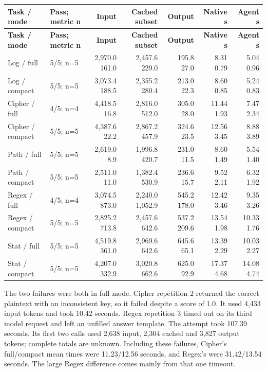 \documentclass[10pt,letterpaper]{article}
\begin{document}
\begingroup
\small
\setlength{\tabcolsep}{4pt}
\renewcommand{\arraystretch}{1.15}
\begin{longtable}{@{}llrrrrr@{}}
\toprule
\textbf{Task / mode} & \textbf{Pass; metric n} & \textbf{Input} & \textbf{Cached subset} & \textbf{Output} & \textbf{Native s} & \textbf{Agent s} \\
\midrule
\endfirsthead
\toprule
\textbf{Task / mode} & \textbf{Pass; metric n} & \textbf{Input} & \textbf{Cached subset} & \textbf{Output} & \textbf{Native s} & \textbf{Agent s} \\
\midrule
\endhead
\bottomrule
\endfoot
Log / full & 5/5; n=5 & 2,970.0 \textpm{} 161.0 & 2,457.6 \textpm{} 229.0 & 195.8 \textpm{} 27.0 & 8.31 \textpm{} 0.79 & 5.04 \textpm{} 0.96 \\
Log / compact & 5/5; n=5 & 3,073.4 \textpm{} 188.5 & 2,355.2 \textpm{} 280.4 & 213.0 \textpm{} 22.3 & 8.60 \textpm{} 0.85 & 5.24 \textpm{} 0.83 \\
Cipher / full & 4/5; n=4 & 4,418.5 \textpm{} 16.8 & 2,816.0 \textpm{} 512.0 & 305.0 \textpm{} 28.0 & 11.44 \textpm{} 1.93 & 7.47 \textpm{} 2.34 \\
Cipher / compact & 5/5; n=5 & 4,387.6 \textpm{} 22.2 & 2,867.2 \textpm{} 457.9 & 324.6 \textpm{} 23.5 & 12.56 \textpm{} 3.45 & 8.88 \textpm{} 3.89 \\
Path / full & 5/5; n=5 & 2,619.0 \textpm{} 8.9 & 1,996.8 \textpm{} 420.7 & 231.0 \textpm{} 11.5 & 8.60 \textpm{} 1.49 & 5.54 \textpm{} 1.40 \\
Path / compact & 5/5; n=5 & 2,511.0 \textpm{} 11.0 & 1,382.4 \textpm{} 530.9 & 236.6 \textpm{} 15.7 & 9.52 \textpm{} 2.11 & 6.32 \textpm{} 1.92 \\
Regex / full & 4/5; n=4 & 3,074.5 \textpm{} 873.0 & 2,240.0 \textpm{} 1,052.9 & 545.2 \textpm{} 178.0 & 12.42 \textpm{} 3.46 & 9.35 \textpm{} 3.26 \\
Regex / compact & 5/5; n=5 & 2,825.2 \textpm{} 713.8 & 2,457.6 \textpm{} 642.6 & 537.2 \textpm{} 209.6 & 13.54 \textpm{} 1.98 & 10.33 \textpm{} 1.76 \\
Stat / full & 5/5; n=5 & 4,519.8 \textpm{} 361.0 & 2,969.6 \textpm{} 642.6 & 645.6 \textpm{} 65.1 & 13.39 \textpm{} 2.29 & 10.03 \textpm{} 2.27 \\
Stat / compact & 5/5; n=5 & 4,207.0 \textpm{} 332.9 & 3,020.8 \textpm{} 662.6 & 625.0 \textpm{} 92.9 & 17.37 \textpm{} 4.68 & 14.08 \textpm{} 4.74 \\
\end{longtable}
\endgroup

The two failures were both in full mode. Cipher repetition 2 returned the correct plaintext with an inconsistent key, so it failed despite a score of 1.0. It used 4,433 input tokens and took 10.42 seconds. Regex repetition 3 timed out on its third model request and left an unfilled answer template. The attempt took 107.39 seconds. Its first two calls used 2,638 input, 2,304 cached and 3,827 output tokens; complete totals are unknown. Including these failures, Cipher's full/compact mean times were 11.23/12.56 seconds, and Regex's were 31.42/13.54 seconds. The large Regex difference comes mainly from that one timeout.
\end{document}
